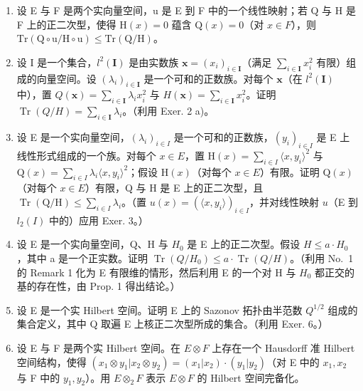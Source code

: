 \begin{enumerate}
\def\labelenumi{\arabic{enumi})}
\setcounter{enumi}{2}
\item
  设 E 与 F 是两个实向量空间，u 是 E 到 F 中的一个线性映射；若 Q 与 H 是 F 上的正二次型，使得 \(\mathrm{H}(x)=0\) 蕴含 \(\mathrm{Q}(x)=0\)（对 \(x\in F\)），则 \(\mathrm{Tr}\left(\mathrm{Q}\circ\mathrm{u}/\mathrm{H}\circ\mathrm{u}\right)\leqslant\mathrm{Tr}\left(\mathrm{Q}/\mathrm{H}\right)\)。
\item
  设 I 是一个集合，\(l^2(\mathbf{I})\) 是由实数族 \(\mathbf{x} = (x_i)_{i \in \mathbf{I}}\)（满足 \(\sum_{i \in \mathbf{I}} x_i^2\) 有限）组成的向量空间。设 \((\lambda_i)_{i \in \mathbf{I}}\) 是一个可和的正数族。对每个 \(\mathbf{x}\)（在 \(l^2(\mathbf{I})\) 中），置 \(Q(\mathbf{x}) = \sum_{i \in \mathbf{I}} \lambda_i x_i^2\) 与 \(H(\mathbf{x}) = \sum_{i \in \mathbf{I}} x_i^2\)。证明 \(\operatorname{Tr}(Q / H) = \sum_{i \in \mathbf{I}} \lambda_i\)。（利用 Exer. 2 a)。
\item
  设 E 是一个实向量空间，\((\lambda_i)_{i \in I}\) 是一个可和的正数族，\((y_i)_{i \in I}\) 是 E 上线性形式组成的一个族。对每个 \(x \in E\)，置 \(\mathrm{H}(x) = \sum_{i \in I} \langle x, y_i \rangle^2\) 与 \(\mathrm{Q}(x) = \sum_{i \in I} \lambda_i \langle x, y_i \rangle^2\)；假设 \(\mathrm{H}(x)\)（对每个 \(x \in E\)）有限。证明 \(\mathrm{Q}(x)\)（对每个 \(x \in E\)）有限，Q 与 H 是 E 上的正二次型，且 \(\operatorname{Tr}(\mathrm{Q}/\mathrm{H}) \leqslant \sum_{i \in I} \lambda_i\)。（置 \(u(x) = (\langle x, y_i \rangle)_{i \in I}\)，并对线性映射 \(u\)（E 到 \(l_2(I)\) 中的）应用 Exer. 3。）
\item
  设 E 是一个实向量空间，Q、H 与 \(H_{0}\) 是 E 上的正二次型。假设 \(H \leqslant a \cdot H_{0}\)，其中 a 是一个正实数。证明 \(\operatorname{Tr}(Q/H_{0}) \leqslant a \cdot \operatorname{Tr}(Q/H)\)。（利用 No.~1 的 Remark 1 化为 E 有限维的情形，然后利用 E 的一个对 H 与 \(H_{0}\) 都正交的基的存在性，由 Prop. 1 得出结论。）
\item
  设 E 是一个实 Hilbert 空间。证明 E 上的 Sazonov 拓扑由半范数 \(Q^{1/2}\) 组成的集合定义，其中 Q 取遍 E 上核正二次型所成的集合。（利用 Exer. 6。）
\item
  设 E 与 F 是两个实 Hilbert 空间。在 \(E \otimes F\) 上存在一个 Hausdorff 准 Hilbert 空间结构，使得 \((x_{1} \otimes y_{1}|x_{2} \otimes y_{2}) = (x_{1}|x_{2}) \cdot (y_{1}|y_{2})\)（对 E 中的 \(x_{1}, x_{2}\) 与 F 中的 \(y_{1}, y_{2}\)）。用 \(E \otimes_{2} F\) 表示 \(E \otimes F\) 的 Hilbert 空间完备化。
\end{enumerate}

